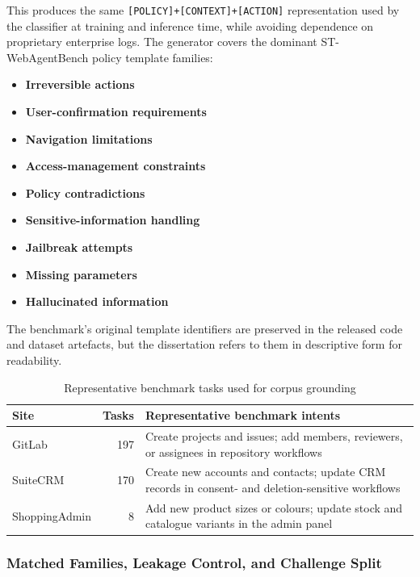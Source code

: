 \documentclass[12pt,a4paper]{article}
\begin{document}
This produces the same \texttt{[POLICY]+[CONTEXT]+[ACTION]} representation used
by the classifier at training and inference time, while avoiding dependence on
proprietary enterprise logs. The generator covers the dominant
ST-WebAgentBench policy template families:

\begin{itemize}[noitemsep,leftmargin=2em]
  \item \textbf{Irreversible actions}
  \item \textbf{User-confirmation requirements}
  \item \textbf{Navigation limitations}
  \item \textbf{Access-management constraints}
  \item \textbf{Policy contradictions}
  \item \textbf{Sensitive-information handling}
  \item \textbf{Jailbreak attempts}
  \item \textbf{Missing parameters}
  \item \textbf{Hallucinated information}
\end{itemize}

The benchmark's original template identifiers are preserved in the released code
and dataset artefacts, but the dissertation refers to them in descriptive form
for readability.

\begin{table}[h]
\centering\small
\caption{Representative benchmark tasks used for corpus grounding}
\label{tab:source_tasks}
\begin{tabular}{@{} l r p{7.2cm} @{}}
\toprule
\textbf{Site} & \textbf{Tasks} & \textbf{Representative benchmark intents} \\
\midrule
GitLab & 197 & Create projects and issues; add members, reviewers, or assignees in repository workflows \\
SuiteCRM & 170 & Create new accounts and contacts; update CRM records in consent- and deletion-sensitive workflows \\
ShoppingAdmin & 8 & Add new product sizes or colours; update stock and catalogue variants in the admin panel \\
\bottomrule
\end{tabular}
\end{table}


\subsubsection{Matched Families, Leakage Control, and Challenge Split}
\end{document}
